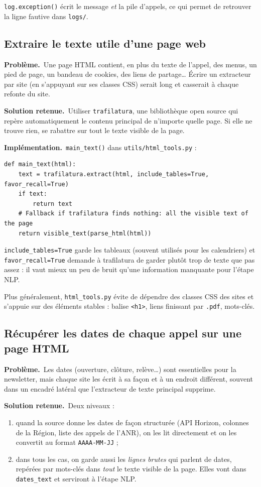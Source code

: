\documentclass[11pt,a4paper]{article}
\newcommand{\pb}{\par\medskip\noindent\textbf{\textcolor{pbcolor}{Problème.}}\ }
\newcommand{\sol}{\par\medskip\noindent\textbf{\textcolor{solcolor}{Solution retenue.}}\ }
\newcommand{\impl}{\par\medskip\noindent\textbf{\textcolor{implcolor}{Implémentation.}}\ }
\newcommand{\code}[1]{\texttt{#1}}
\begin{document}
\code{log.exception()} écrit le message \emph{et} la pile d'appels, ce qui permet de
retrouver la ligne fautive dans \code{logs/}.

\subsection{Extraire le texte utile d'une page web}

\pb Une page HTML contient, en plus du texte de l'appel, des menus, un pied de page, un
bandeau de cookies, des liens de partage\dots{} Écrire un extracteur par site (en
s'appuyant sur ses classes CSS) serait long et casserait à chaque refonte du site.

\sol Utiliser \code{trafilatura}, une bibliothèque open source qui repère automatiquement
le contenu principal de n'importe quelle page. Si elle ne trouve rien, se rabattre sur tout
le texte visible de la page.

\impl \code{main\_text()} dans \code{utils/html\_tools.py} :

\begin{lstlisting}
def main_text(html):
    text = trafilatura.extract(html, include_tables=True, favor_recall=True)
    if text:
        return text
    # Fallback if trafilatura finds nothing: all the visible text of the page
    return visible_text(parse_html(html))
\end{lstlisting}

\code{include\_tables=True} garde les tableaux (souvent utilisés pour les calendriers) et
\code{favor\_recall=True} demande à trafilatura de garder plutôt trop de texte que pas
assez : il vaut mieux un peu de bruit qu'une information manquante pour l'étape NLP.

Plus généralement, \code{html\_tools.py} évite de dépendre des classes CSS des sites et
s'appuie sur des éléments stables : balise \code{<h1>}, liens finissant par \code{.pdf},
mots-clés.

\subsection{Récupérer les dates de chaque appel sur une page HTML}
\label{sec:dates-html}

\pb Les dates (ouverture, clôture, relève\dots) sont essentielles pour la newsletter, mais
chaque site les écrit à sa façon et à un endroit différent, souvent dans un encadré
latéral que l'extracteur de texte principal supprime.

\sol Deux niveaux :
\begin{enumerate}
  \item quand la source donne les dates de façon structurée (API Horizon, colonnes de la
        Région, liste des appels de l'ANR), on les lit directement et on les convertit au
        format \code{AAAA-MM-JJ} ;
  \item dans tous les cas, on garde aussi les \emph{lignes brutes} qui parlent de dates,
        repérées par mots-clés dans \emph{tout} le texte visible de la page. Elles vont
        dans \code{dates\_text} et serviront à l'étape NLP.
\end{enumerate}
\end{document}
